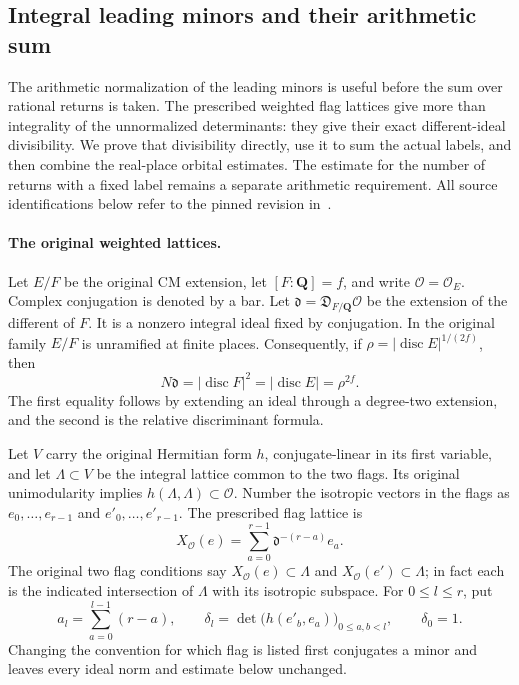 \subsection{Integral leading minors and their arithmetic sum}
\label{shared-integral-leading-minors}

The arithmetic normalization of the leading minors is useful before
the sum over rational returns is taken.  The prescribed weighted flag
lattices give more than integrality of the unnormalized determinants:
they give their exact different-ideal divisibility.  We prove that
divisibility directly, use it to sum the actual labels, and then
combine the real-place orbital estimates.  The estimate for the
number of returns with a fixed label remains a separate arithmetic
requirement.  All source identifications below refer to the pinned
revision in~\cite{global-gram-integral-minors-source}.

\paragraph{The original weighted lattices.}
Let $E/F$ be the original CM extension, let $[F:\mathbf Q]=f$,
and write $\mathcal O=\mathcal O_E$.  Complex conjugation is denoted
by a bar.  Let $\mathfrak d=\mathfrak D_{F/\mathbf Q}\mathcal O$
be the extension of the different of $F$.  It is a nonzero integral
ideal fixed by conjugation.  In the original family $E/F$ is
unramified at finite places.  Consequently, if
$\rho=|\operatorname{disc} E|^{1/(2f)}$, then
\begin{equation}\label{eq:minor-different-norm}
 N\mathfrak d=|\operatorname{disc}F|^2
             =|\operatorname{disc}E|=\rho^{2f}.
\end{equation}
The first equality follows by extending an ideal through a degree-two
extension, and the second is the relative discriminant formula.

Let $V$ carry the original Hermitian form $h$, conjugate-linear in
its first variable, and let $\Lambda\subset V$ be the integral
lattice common to the two flags.  Its original unimodularity
implies $h(\Lambda,\Lambda)\subset\mathcal O$.
Number the isotropic vectors in the flags as
$e_0,\ldots,e_{r-1}$ and $e'_0,\ldots,e'_{r-1}$.
The prescribed flag lattice is
\[
 X_{\mathcal O}(e)=\sum_{a=0}^{r-1}\mathfrak d^{-(r-a)}e_a.
\]
The original two flag conditions say
$X_{\mathcal O}(e)\subset\Lambda$ and
$X_{\mathcal O}(e')\subset\Lambda$; in fact each is the indicated
intersection of $\Lambda$ with its isotropic subspace.
For $0\le l\le r$, put
\[
 a_l=\sum_{a=0}^{l-1}(r-a),\qquad
 \delta_l=\det\bigl(h(e'_b,e_a)\bigr)_{0\le a,b<l},
 \qquad \delta_0=1.
\]
Changing the convention for which flag is listed first conjugates a
minor and leaves every ideal norm and estimate below unchanged.

